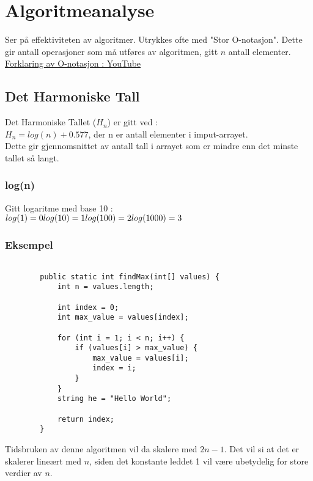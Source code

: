 \documentclass[11pt]{article}
\begin{document}
\newpage

\section{Algoritmeanalyse}

Ser på effektiviteten av algoritmer. Utrykkes ofte med "Stor O-notasjon". Dette gir antall operasjoner som må utføres av algoritmen, gitt $n$ antall elementer. \\
\href{https://www.youtube.com/watch?v=dNorFNlDbX0}{Forklaring av O-notasjon : YouTube}

\subsection{Det Harmoniske Tall}
Det Harmoniske Tallet ($H_n$) er gitt ved : \\
$H_n = log(n) + 0.577$, der n er antall elementer i imput-arrayet. \\
Dette gir gjennomsnittet av antall tall i arrayet som er mindre enn det minste tallet så langt.

\subsubsection{log(n)}
Gitt logaritme med base 10 :\\
$log(1) = 0 \\
	log(10) = 1 \\
	log(100) = 2 \\
	log(1000) = 3$


\subsubsection{Eksempel}

\begin{lstlisting}
			 
	 	public static int findMax(int[] values) {
			int n = values.length;	 		
	 		
	 		int index = 0;
	 		int max_value = values[index];
	 		
	 		for (int i = 1; i < n; i++) {
	 			if (values[i] > max_value) {
	 				max_value = values[i];
	 				index = i;
	 			}
	 		}
	 		string he = "Hello World";
	 		
	 		return index;
	 	}
	 \end{lstlisting}


Tidsbruken av denne algoritmen vil da skalere med $2n - 1$. Det vil si at det er skalerer lineært med $n$, siden det konstante leddet 1 vil være ubetydelig for store verdier av $n$.
\end{document}
